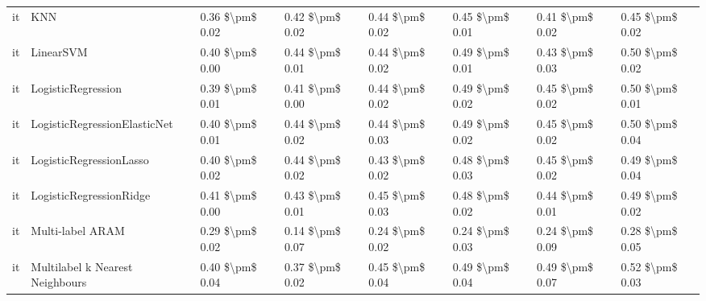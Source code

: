 \begin{tabular}{llllllll}
      it &                             KNN & 0.36 \$\textbackslash pm\$ 0.02 &           0.42 \$\textbackslash pm\$ 0.02 &       0.44 \$\textbackslash pm\$ 0.02 &        0.45 \$\textbackslash pm\$ 0.01 &                         0.41 \$\textbackslash pm\$ 0.02 &     0.45 \$\textbackslash pm\$ 0.02 \\
      it &                       LinearSVM & 0.40 \$\textbackslash pm\$ 0.00 &           0.44 \$\textbackslash pm\$ 0.01 &       0.44 \$\textbackslash pm\$ 0.02 &        0.49 \$\textbackslash pm\$ 0.01 &                         0.43 \$\textbackslash pm\$ 0.03 &     0.50 \$\textbackslash pm\$ 0.02 \\
      it &              LogisticRegression & 0.39 \$\textbackslash pm\$ 0.01 &           0.41 \$\textbackslash pm\$ 0.00 &       0.44 \$\textbackslash pm\$ 0.02 &        0.49 \$\textbackslash pm\$ 0.02 &                         0.45 \$\textbackslash pm\$ 0.02 &     0.50 \$\textbackslash pm\$ 0.01 \\
      it &    LogisticRegressionElasticNet & 0.40 \$\textbackslash pm\$ 0.01 &           0.44 \$\textbackslash pm\$ 0.02 &       0.44 \$\textbackslash pm\$ 0.03 &        0.49 \$\textbackslash pm\$ 0.02 &                         0.45 \$\textbackslash pm\$ 0.02 &     0.50 \$\textbackslash pm\$ 0.04 \\
      it &         LogisticRegressionLasso & 0.40 \$\textbackslash pm\$ 0.02 &           0.44 \$\textbackslash pm\$ 0.02 &       0.43 \$\textbackslash pm\$ 0.02 &        0.48 \$\textbackslash pm\$ 0.03 &                         0.45 \$\textbackslash pm\$ 0.02 &     0.49 \$\textbackslash pm\$ 0.04 \\
      it &         LogisticRegressionRidge & 0.41 \$\textbackslash pm\$ 0.00 &           0.43 \$\textbackslash pm\$ 0.01 &       0.45 \$\textbackslash pm\$ 0.03 &        0.48 \$\textbackslash pm\$ 0.02 &                         0.44 \$\textbackslash pm\$ 0.01 &     0.49 \$\textbackslash pm\$ 0.02 \\
      it &                Multi-label ARAM & 0.29 \$\textbackslash pm\$ 0.02 &           0.14 \$\textbackslash pm\$ 0.07 &       0.24 \$\textbackslash pm\$ 0.02 &        0.24 \$\textbackslash pm\$ 0.03 &                         0.24 \$\textbackslash pm\$ 0.09 &     0.28 \$\textbackslash pm\$ 0.05 \\
      it & Multilabel k Nearest Neighbours & 0.40 \$\textbackslash pm\$ 0.04 &           0.37 \$\textbackslash pm\$ 0.02 &       0.45 \$\textbackslash pm\$ 0.04 &        0.49 \$\textbackslash pm\$ 0.04 &                         0.49 \$\textbackslash pm\$ 0.07 &     0.52 \$\textbackslash pm\$ 0.03 \\

\end{tabular}
